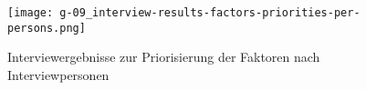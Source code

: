 \begin{figure}[h]
    \centering
    \texttt{[image: g-09\_interview-results-factors-priorities-per-persons.png]}
    \caption{Interviewergebnisse zur Priorisierung der Faktoren nach Interviewpersonen}
    \label{fig:g-09_interview-results-factors-priorities-per-persons}
\end{figure}
